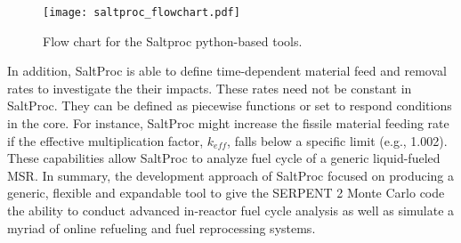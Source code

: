 \begin{figure}[htp!] %
  \centering
  \vspace{-0.3em}
  \texttt{[image: saltproc\_flowchart.pdf]}
  \caption{Flow chart for the Saltproc python-based tools.}
  \vspace{-1.0em}
  \label{fig:saltproc_flow}
\end{figure}
\FloatBarrier

In addition, SaltProc is able to define time-dependent material feed and removal rates to investigate the their impacts. These rates need not be
constant in SaltProc. They can be defined as piecewise functions or set to respond conditions in the core. For instance, SaltProc might increase the
fissile material feeding rate if the effective multiplication factor, $k_{eff}$, falls below a specific limit (e.g., 1.002).
These capabilities allow SaltProc to analyze fuel cycle of a generic liquid-fueled \gls{MSR}. In summary, the development approach of SaltProc focused
on producing a generic, flexible and expandable tool to give the SERPENT 2 Monte Carlo code the ability to conduct advanced in-reactor
fuel cycle analysis as well as simulate a myriad of online refueling and fuel reprocessing systems.

